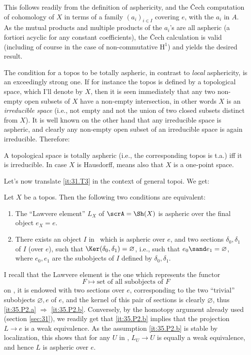 This follows readily from the definition of asphericity, and the
\v{C}ech computation of cohomology of $X$ in terms of a family
$(a_i)_{i\in I}$ covering $e$, with the $a_i$ in $A$. As the mutual
products and multiple products of the $a_i$'s are all aspheric (a
fortiori acyclic for any constant coefficients), the \v Cech
calculation is valid (including of course in the case of
non-commutative $\mathrm H^1$) and yields the desired result.

The condition for a topos to be totally aspheric, in contrast to
\emph{local} asphericity, is an exceedingly strong one. If for
instance the topos is defined by a topological space, which I'll
denote by $X$, then it is seen immediately that any two non-empty open
subsets of $X$ have a non-empty intersection, in other words $X$ is an
\emph{irreducible space} (i.e., not empty and not the union of two
closed subsets distinct from $X$). It is well known on the other hand
that any irreducible space is aspheric, and clearly any non-empty open
subset of an irreducible space is again irreducible. Therefore:
\setcounter{corollarynum}{1}
\begin{corollarynum}\label{cor:35.1.2}
  A topological space is totally aspheric \textup{(}i.e., the
  corresponding topos is t.a.\textup{)} if{f} it is irreducible. In
  case $X$ is Hausdorff, means also that $X$ is a one-point space.
\end{corollarynum}

Let's now translate \ref{it:31.T3} in the context of general topoi. We
get:

\begin{propositionnum}\label{prop:35.2}
  Let $X$ be a topos. Then the following two conditions are
  equivalent:
  \begin{enumerate}[label=\alph*),font=\normalfont]
  \item\label{it:35.P2.a}
    The ``Lawvere element'' $L_X$ of $\scrA = \Sh(X)$ is aspheric
    over the final object $e_X=e$.
  \item\label{it:35.P2.b}
    There exists an object $I$ in \scrA\ which is aspheric over
    $e$, and two sections $\delta_0,\delta_1$ of $I$ \textup(over
    $e$\textup), such that $\Ker(\delta_0,\delta_1)=\varnothing$, i.e.,
    such that $e_0 \sand e_1 = \varnothing$, where $e_0,e_1$ are the
    subobjects of $I$ defined by $\delta_0,\delta_1$.
  \end{enumerate}
\end{propositionnum}

I recall that the Lawvere element is the one which represents the
functor
\[ F \mapsto \text{set of all subobjects of $F$}\]
on \scrA, it is endowed with two sections over $e$, corresponding to
the two ``trivial'' subobjects $\varnothing, e$ of $e$, and the kernel
of this pair of sections is clearly $\varnothing$, thus \ref{it:35.P2.a}
$\Rightarrow$ \ref{it:35.P2.b}. Conversely, by the homotopy argument
already used (section \ref{sec:31}),
we readily get that \ref{it:35.P2.b}
implies that the projection $L\to e$ is a weak
equivalence. As the assumption \ref{it:35.P2.b} is stable by
localization, this shows that for any $U$ in \scrA, $L_U \to U$ is
equally a weak equivalence, and hence $L$ is aspheric over $e$.


